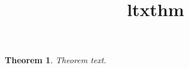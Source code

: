 \documentclass{article}
\title{ltxthm}
\begin{document}

\newtheorem{theorem}{Theorem}

\begin{theorem}
Theorem text.

\end{theorem}
\end{document}
